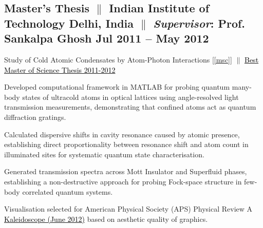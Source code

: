 \subsection{Master's Thesis $\|$ Indian Institute of Technology Delhi, India $\|$ {\textit{Supervisor}}: Prof. Sankalpa Ghosh \hfill Jul 2011 -- May 2012}
\vspace{0.1cm}
Study of Cold Atomic Condensates by Atom-Photon Interactions [{\ref{msc}}] $\|$ {\href{https://github.com/madhurima-nath/madhurima-nath.github.io/blob/main/docs/IIT_Award.pdf} {\textcolor{black}{Best Master of Science Thesis 2011-2012}}}
\begin{zitemize}
\item Developed computational framework in MATLAB for probing quantum many-body states of ultracold atoms in optical lattices using angle-resolved light transmission measurements, demonstrating that confined atoms act as quantum diffraction gratings.
\item Calculated dispersive shifts in cavity resonance caused by atomic presence, establishing direct proportionality between resonance shift and atom count in illuminated sites for systematic quantum state characterisation.
\item Generated transmission spectra across Mott Insulator and Superfluid phases, establishing a non-destructive approach for probing Fock-space structure in few-body correlated quantum systems.
\item Visualisation selected for American Physical Society (APS) Physical Review A 
{\href{https://journals.aps.org/pra/kaleidoscope/pra/85/6/063606}{\underline{\textcolor{black}{Kaleidoscope (June 2012)}}}} based on aesthetic quality of graphics.
\end{zitemize}
